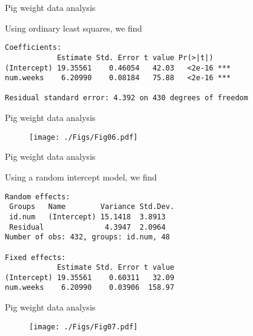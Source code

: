 \documentclass{beamer}
\newcommand{\1}{{\mathbf{1}}}
\begin{document}

\begin{frame}[fragile]{Pig weight data analysis}

Using ordinary least squares, we find 
\tiny
\begin{verbatim}
Coefficients:
            Estimate Std. Error t value Pr(>|t|)    
(Intercept) 19.35561    0.46054   42.03   <2e-16 ***
num.weeks    6.20990    0.08184   75.88   <2e-16 ***

Residual standard error: 4.392 on 430 degrees of freedom
\end{verbatim}

\end{frame}



\begin{frame}{Pig weight data analysis}

\begin{figure}[h]
    \texttt{[image: ./Figs/Fig06.pdf]}  
\end{figure}

\end{frame}



\begin{frame}[fragile]{Pig weight data analysis}

Using a random intercept model, we find
\tiny
\begin{verbatim}
Random effects:
 Groups   Name        Variance Std.Dev.
 id.num   (Intercept) 15.1418  3.8913  
 Residual              4.3947  2.0964  
Number of obs: 432, groups: id.num, 48

Fixed effects:
            Estimate Std. Error t value
(Intercept) 19.35561    0.60311   32.09
num.weeks    6.20990    0.03906  158.97
\end{verbatim}

\end{frame}



\begin{frame}{Pig weight data analysis}

\begin{figure}[h]
    \texttt{[image: ./Figs/Fig07.pdf]}  
\end{figure}

\end{frame}
\end{document}
